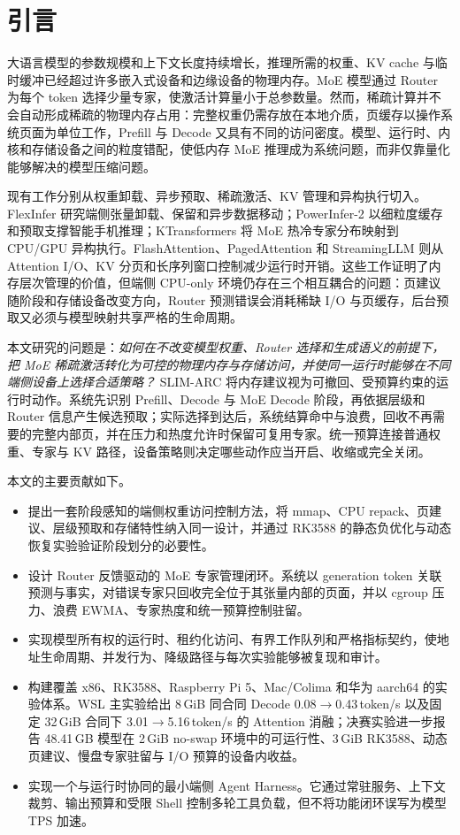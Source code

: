 \section{引言}
\label{sec:introduction}

大语言模型的参数规模和上下文长度持续增长，推理所需的权重、KV cache 与临时缓冲已经超过许多嵌入式设备和边缘设备的物理内存。MoE 模型通过 Router 为每个 token 选择少量专家，使激活计算量小于总参数量\cite{shazeer2017moe,fedus2022switch}。然而，稀疏计算并不会自动形成稀疏的物理内存占用：完整权重仍需存放在本地介质，页缓存以操作系统页面为单位工作，Prefill 与 Decode 又具有不同的访问密度。模型、运行时、内核和存储设备之间的粒度错配，使低内存 MoE 推理成为系统问题，而非仅靠量化能够解决的模型压缩问题。

现有工作分别从权重卸载、异步预取、稀疏激活、KV 管理和异构执行切入。FlexInfer 研究端侧张量卸载、保留和异步数据移动\cite{flexinfer2025}；PowerInfer-2 以细粒度缓存和预取支撑智能手机推理\cite{powerinfer2_2024}；KTransformers 将 MoE 热冷专家分布映射到 CPU/GPU 异构执行\cite{ktransformers2025}。FlashAttention、PagedAttention 和 StreamingLLM 则从 Attention I/O、KV 分页和长序列窗口控制减少运行时开销\cite{flashattention2022,pagedattention2023,streamingllm2024}。这些工作证明了内存层次管理的价值，但端侧 CPU-only 环境仍存在三个相互耦合的问题：页建议随阶段和存储设备改变方向，Router 预测错误会消耗稀缺 I/O 与页缓存，后台预取又必须与模型映射共享严格的生命周期。

本文研究的问题是：\emph{如何在不改变模型权重、Router 选择和生成语义的前提下，把 MoE 稀疏激活转化为可控的物理内存与存储访问，并使同一运行时能够在不同端侧设备上选择合适策略？} SLIM-ARC 将内存建议视为可撤回、受预算约束的运行时动作。系统先识别 Prefill、Decode 与 MoE Decode 阶段，再依据层级和 Router 信息产生候选预取；实际选择到达后，系统结算命中与浪费，回收不再需要的完整内部页，并在压力和热度允许时保留可复用专家。统一预算连接普通权重、专家与 KV 路径，设备策略则决定哪些动作应当开启、收缩或完全关闭。

本文的主要贡献如下。
\begin{itemize}
  \item 提出一套阶段感知的端侧权重访问控制方法，将 mmap、CPU repack、页建议、层级预取和存储特性纳入同一设计，并通过 RK3588 的静态负优化与动态恢复实验验证阶段划分的必要性。
  \item 设计 Router 反馈驱动的 MoE 专家管理闭环。系统以 generation token 关联预测与事实，对错误专家只回收完全位于其张量内部的页面，并以 cgroup 压力、浪费 EWMA、专家热度和统一预算控制驻留。
  \item 实现模型所有权的运行时、租约化访问、有界工作队列和严格指标契约，使地址生命周期、并发行为、降级路径与每次实验能够被复现和审计。
  \item 构建覆盖 x86、RK3588、Raspberry Pi 5、Mac/Colima 和华为 aarch64 的实验体系。WSL 主实验给出 8\,GiB 同合同 Decode 0.08$\rightarrow$0.43\,token/s 以及固定 32\,GiB 合同下 3.01$\rightarrow$5.16\,token/s 的 Attention 消融；决赛实验进一步报告 48.41\,GB 模型在 2\,GiB no-swap 环境中的可运行性、3\,GiB RK3588、动态页建议、慢盘专家驻留与 I/O 预算的设备内收益。
  \item 实现一个与运行时协同的最小端侧 Agent Harness。它通过常驻服务、上下文裁剪、输出预算和受限 Shell 控制多轮工具负载，但不将功能闭环误写为模型 TPS 加速。
\end{itemize}

